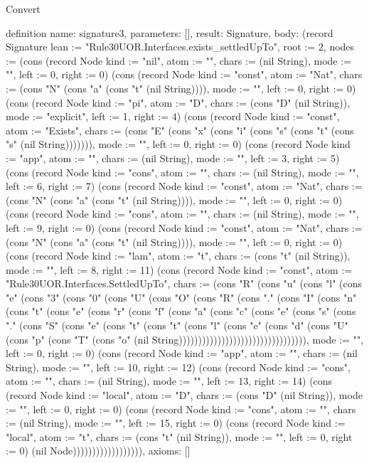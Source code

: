 \begin{lexlean}{Convert}
\begin{semanticmodule}
definition{
  name: signature3,
  parameters: [],
  result: Signature,
  body: (record Signature {lean := "Rule30UOR.Interfaces.exists_settledUpTo", root := 2, nodes := (cons (record Node {kind := "nil", atom := "", chars := (nil String), mode := "", left := 0, right := 0}) (cons (record Node {kind := "const", atom := "Nat", chars := (cons "N" (cons "a" (cons "t" (nil String)))), mode := "", left := 0, right := 0}) (cons (record Node {kind := "pi", atom := "D", chars := (cons "D" (nil String)), mode := "explicit", left := 1, right := 4}) (cons (record Node {kind := "const", atom := "Exists", chars := (cons "E" (cons "x" (cons "i" (cons "s" (cons "t" (cons "s" (nil String))))))), mode := "", left := 0, right := 0}) (cons (record Node {kind := "app", atom := "", chars := (nil String), mode := "", left := 3, right := 5}) (cons (record Node {kind := "cons", atom := "", chars := (nil String), mode := "", left := 6, right := 7}) (cons (record Node {kind := "const", atom := "Nat", chars := (cons "N" (cons "a" (cons "t" (nil String)))), mode := "", left := 0, right := 0}) (cons (record Node {kind := "cons", atom := "", chars := (nil String), mode := "", left := 9, right := 0}) (cons (record Node {kind := "const", atom := "Nat", chars := (cons "N" (cons "a" (cons "t" (nil String)))), mode := "", left := 0, right := 0}) (cons (record Node {kind := "lam", atom := "t", chars := (cons "t" (nil String)), mode := "", left := 8, right := 11}) (cons (record Node {kind := "const", atom := "Rule30UOR.Interfaces.SettledUpTo", chars := (cons "R" (cons "u" (cons "l" (cons "e" (cons "3" (cons "0" (cons "U" (cons "O" (cons "R" (cons "." (cons "I" (cons "n" (cons "t" (cons "e" (cons "r" (cons "f" (cons "a" (cons "c" (cons "e" (cons "s" (cons "." (cons "S" (cons "e" (cons "t" (cons "t" (cons "l" (cons "e" (cons "d" (cons "U" (cons "p" (cons "T" (cons "o" (nil String))))))))))))))))))))))))))))))))), mode := "", left := 0, right := 0}) (cons (record Node {kind := "app", atom := "", chars := (nil String), mode := "", left := 10, right := 12}) (cons (record Node {kind := "cons", atom := "", chars := (nil String), mode := "", left := 13, right := 14}) (cons (record Node {kind := "local", atom := "D", chars := (cons "D" (nil String)), mode := "", left := 0, right := 0}) (cons (record Node {kind := "cons", atom := "", chars := (nil String), mode := "", left := 15, right := 0}) (cons (record Node {kind := "local", atom := "t", chars := (cons "t" (nil String)), mode := "", left := 0, right := 0}) (nil Node)))))))))))))))))}),
  axioms: []
}


\end{semanticmodule}
\end{lexlean}
